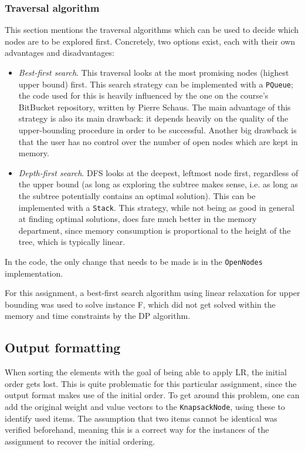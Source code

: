 \documentclass[journal]{IEEEtran}
\newcommand{\scala}[1]{\texttt{#1}}
\begin{document}
\subsubsection{Traversal algorithm}
This section mentions the traversal algorithms which can be used to decide which nodes are to be explored first.
Concretely, two options exist, each with their own advantages and disadvantages:
\begin{itemize}
	\item \emph{Best-first search}.
	This traversal looks at the most promising nodes (highest upper bound) first.
	This search strategy can be implemented with a \scala{PQueue}; the code used for this is heavily influenced by the one on the course's BitBucket repository, written by Pierre Schaus.
	The main advantage of this strategy is also its main drawback: it depends heavily on the quality of the upper-bounding procedure in order to be successful.
	Another big drawback is that the user has no control over the number of open nodes which are kept in memory.
	\item \emph{Depth-first search}.
	DFS looks at the deepest, leftmost node first, regardless of the upper bound (as long as exploring the subtree makes sense, i.e. as long as the subtree potentially contains an optimal solution).
	This can be implemented with a \scala{Stack}.
	This strategy, while not being as good in general at finding optimal solutions, does fare much better in the memory department, since memory consumption is proportional to the height of the tree, which is typically linear.
\end{itemize}
In the code, the only change that needs to be made is in the \scala{OpenNodes} implementation.

For this assignment, a best-first search algorithm using linear relaxation for upper bounding was used to solve instance F, which did not get solved within the memory and time constraints by the DP algorithm.

\subsection{Output formatting}
\label{sec:bnboutput}
When sorting the elements with the goal of being able to apply LR, the initial order gets lost.
This is quite problematic for this particular assignment, since the output format makes use of the initial order.
To get around this problem, one can add the original weight and value vectors to the \scala{KnapsackNode}, using these to identify used items.
The assumption that two items cannot be identical was verified beforehand, meaning this is a correct way for the instances of the assignment to recover the initial ordering.
\end{document}
